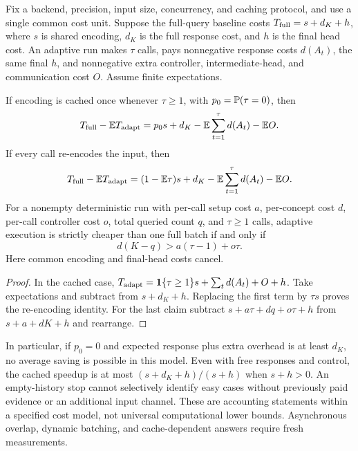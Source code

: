 \begin{acamprop}
\label{prop:acam-cost}
Fix a backend, precision, input size, concurrency, and caching protocol,
and use a single common cost unit. Suppose the full-query baseline costs
$T_{\rm full}=s+d_K+h$, where $s$ is shared encoding, $d_K$ is the full
response cost, and $h$ is the final head cost. An adaptive run makes
$\tau$ calls, pays nonnegative response costs $d(A_t)$, the same final
$h$, and nonnegative extra controller, intermediate-head, and
communication cost $O$. Assume finite expectations.

If encoding is cached once whenever $\tau\geq1$, with
$p_0=\mathbb{P}(\tau=0)$, then
\[
 T_{\rm full}-\mathbb{E} T_{\rm adapt}
 =p_0s+d_K-\mathbb{E}\sum_{t=1}^{\tau}d(A_t)-\mathbb{E} O.
\]
If every call re-encodes the input, then
\[
 T_{\rm full}-\mathbb{E} T_{\rm adapt}
 =(1-\mathbb{E}\tau)s+d_K-\mathbb{E}\sum_{t=1}^{\tau}d(A_t)-\mathbb{E} O.
\]
For a nonempty deterministic run with per-call setup cost $a$, per-concept
cost $d$, per-call controller cost $o$, total queried count $q$, and
$\tau\geq1$ calls, adaptive execution is strictly cheaper than one full
batch if and only if
\[
 d(K-q)>a(\tau-1)+o\tau.
\]
Here common encoding and final-head costs cancel.
\end{acamprop}

\begin{proof}
In the cached case,
$T_{\rm adapt}=\mathbf1\{\tau\geq1\}s+\sum_td(A_t)+O+h$.
Take expectations and subtract from $s+d_K+h$. Replacing the first term
by $\tau s$ proves the re-encoding identity. For the last claim subtract
$s+a\tau+dq+o\tau+h$ from $s+a+dK+h$ and rearrange.
\end{proof}

In particular, if $p_0=0$ and expected response plus extra overhead is at
least $d_K$, no average saving is possible in this model. Even with free
responses and control, the cached speedup is at most
$(s+d_K+h)/(s+h)$ when $s+h>0$. An empty-history stop cannot selectively
identify easy cases without previously paid evidence or an additional
input channel. These are accounting statements within a specified cost
model, not universal computational lower bounds. Asynchronous overlap,
dynamic batching, and cache-dependent answers require fresh measurements.

